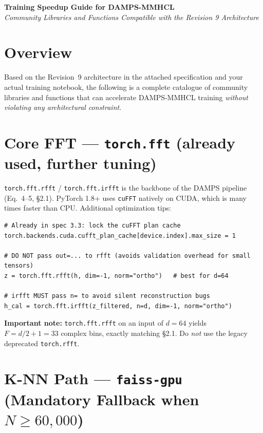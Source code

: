 \documentclass[11pt, a4paper]{article}
\begin{document}
\begin{center}
\LARGE \textbf{Training Speedup Guide for DAMPS-MMHCL}\\[0.4em]
\normalsize \textit{Community Libraries and Functions Compatible with the Revision 9 Architecture}
\end{center}
\vspace{1em}

\section*{Overview}

Based on the Revision~9 architecture in the attached specification and your actual training notebook, the following is a complete catalogue of community libraries and functions that can accelerate DAMPS-MMHCL training \emph{without violating any architectural constraint}.

\section{Core FFT --- \texttt{torch.fft} (already used, further tuning)}

\texttt{torch.fft.rfft} / \texttt{torch.fft.irfft} is the backbone of the DAMPS pipeline (Eq.~4--5, \S2.1). PyTorch 1.8+ uses \texttt{cuFFT} natively on CUDA, which is many times faster than CPU. Additional optimization tips:

\begin{lstlisting}
# Already in spec 3.3: lock the cuFFT plan cache
torch.backends.cuda.cufft_plan_cache[device.index].max_size = 1

# DO NOT pass out=... to rfft (avoids validation overhead for small tensors)
z = torch.fft.rfft(h, dim=-1, norm="ortho")   # best for d=64

# irfft MUST pass n= to avoid silent reconstruction bugs
h_cal = torch.fft.irfft(z_filtered, n=d, dim=-1, norm="ortho")
\end{lstlisting}

\textbf{Important note:} \texttt{torch.fft.rfft} on an input of \(d=64\) yields \(F = d/2 + 1 = 33\) complex bins, exactly matching \S2.1. Do \emph{not} use the legacy deprecated \texttt{torch.rfft}.

\section{K-NN Path --- \texttt{faiss-gpu} (Mandatory Fallback when \(N \geq 60{,}000\))}
\end{document}
